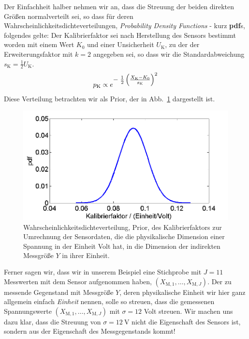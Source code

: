 Der Einfachheit halber nehmen wir an, dass die Streuung der beiden direkten Größen
normalverteilt sei, so dass für deren Wahrscheinlichkeitsdichteverteilungen,
\textsl{Probability Density Functions} - kurz \textbf{pdf}s, folgendes gelte:
Der Kalibrierfaktor sei nach Herstellung des Sensors bestimmt worden mit einem Wert
$K_0$ und einer Unsicherheit $U_\mathrm{K}$, zu der der Erweiterungsfaktor mit $k = 2$
angegeben sei, so dass wir die Standardabweichung $s_\mathrm{K} = \frac{1}{2} U_\mathrm{K}$.
\begin{equation}
p_\mathrm{K} \propto 
 e^{\textstyle -\;\frac{1}{2} \left(\frac{ X_\mathrm{K} - K_0}{s_\mathrm{K}} \right)^2}
\label{PriorKalibrierfaktor}
\end{equation}
Diese Verteilung betrachten wir als Prior, der in Abb.~\ref{fig:Kalibrierfaktor} dargestellt ist.
\begin{figure}[!htp]
	\begin{center}
		\includegraphics[width=140mm]{10_vorlesung/media/Kalibrierfaktor.png}
		\caption{Wahrscheinlichkeitsdichteverteilung, Prior, des
		Kalibrierfaktors zur Umrechnung der Sensordaten, die die physikalische
		Dimension einer Spannung in der Einheit Volt hat, in die Dimension der
		indirekten Messgröße $Y$ in ihrer Einheit.}
		\label{fig:Kalibrierfaktor}
	\end{center}
\end{figure}
Ferner sagen wir, dass wir in unserem Beispiel eine Stichprobe mit $J = 11$ Messwerten
mit dem Sensor aufgenommen haben, $(X_{\mathrm{M},1}, \dots, X_{\mathrm{M},J})$.
Der zu messende Gegenstand mit Messgröße $Y$, deren physikalische Einheit wir hier
ganz allgemein einfach \textsl{Einheit} nennen, solle so streuen, dass die gemessenen
Spannungswerte $(X_{\mathrm{M},1}, \dots, X_{\mathrm{M},J})$ mit $\sigma = 12$ Volt streuen.
Wir machen uns dazu klar, dass die Streuung von $\sigma = 12~\mathrm{V}$ nicht die Eigenschaft
des Sensors ist, sondern aus der Eigenschaft des Messgegenstands kommt!

